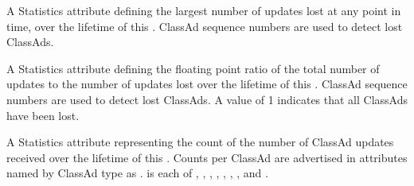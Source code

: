 \begin{description}
\item[\AdAttr{UpdatesLostMax}:] A Statistics attribute defining
  the largest number of updates lost at any point in time, 
  over the lifetime of this .
  ClassAd sequence numbers are used to detect lost ClassAds.

\item[\AdAttr{UpdatesLostRatio}:] A Statistics attribute defining
  the floating point ratio of the total number of updates to
  the number of updates lost 
  over the lifetime of this .
  ClassAd sequence numbers are used to detect lost ClassAds.
  A value of 1 indicates that all ClassAds have been lost.

\item[\AdAttr{UpdatesTotal}:] A Statistics attribute representing the
  count of the number of ClassAd updates received
  over the lifetime of this .
  Counts per ClassAd are advertised in attributes named by ClassAd type
  as .
   is each of , ,
  , , , ,
  , and .

\end{description}

